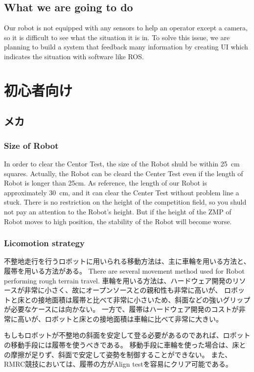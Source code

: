 \documentclass[journal]{IEEEtran}
\begin{document}
\subsection{What we are going to do}
Our robot is not equipped with any sensors to help an operator except a camera, so it is difficult to see what the situation it is in.
To solve this issue, we are planning to build a system that feedback many information by creating UI which indicates the situation with software like ROS.

\section{初心者向け}
\subsection{メカ}
\subsubsection{Size of Robot}
In order to clear the Centor Test, the size of the Robot shuld be within \SI{25}{\cm} squares.
Actually, the Robot can be cleard the Center Test even if the length of Robot is longer than 25cm.
As reference, the length of our Robot is approximately \SI{30}{\cm}, and it can clear the Center Test without problem line a stuck.
There is no restriction on the height of the competition field, so you shuld not pay an attention to the Robot's height. But if the height of the ZMP of Robot moves to high position, the stability of the Robot will become worse.

\subsubsection{Licomotion strategy}
不整地走行を行うロボットに用いられる移動方法は、主に車輪を用いる方法と、履帯を用いる方法がある。
There are several movement method used for Robot performing rough terrain travel.
車輪を用いる方法は、ハードウェア開発のリソースが非常に小さく、故にオープンソースとの親和性も非常に高いが、
ロボットと床との接地面積は履帯と比べて非常に小さいため、斜面などの強いグリップが必要なケースには向かない。
一方で、履帯はハードウェア開発のコストが非常に高いが、ロボットと床との接地面積は車輪に比べて非常に大きい。

もしもロボットが不整地の斜面を安定して登る必要があるのであれば、ロボットの移動手段には履帯を使うべきである。
移動手段に車輪を使った場合は、床との摩擦が足りず、斜面で安定して姿勢を制御することができない。
また、RMRC競技においては、履帯の方がAlign testを容易にクリア可能である。
\end{document}
